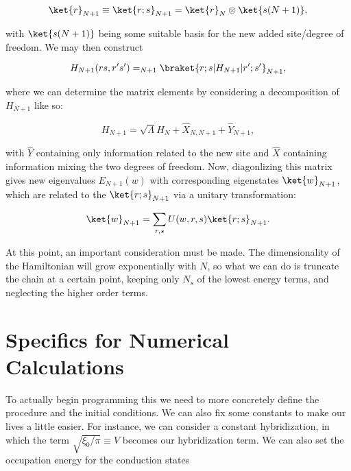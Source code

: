 \begin{equation}
  \ket{r}_{N+1} \equiv \ket{r;s}_{N+1} = \ket{r}_N \otimes \ket{s(N+1)},
\end{equation}

with $\ket{s(N+1)}$ being some suitable basis for the new added site/degree of freedom. We may then construct

\begin{equation}
  H_{N+1}(rs, r's') = _{N+1}\braket{r;s | H_{N+1} | r';s'}_{N+1},
\end{equation}

where we can determine the matrix elements by considering a decomposition of $H_{N+1}$ like so:

\begin{equation}
  H_{N+1} = \sqrt{\Lambda}H_N + \hat{X}_{N,N+1} + \hat{Y}_{N+1},
\end{equation}

with $\hat{Y}$ containing only information related to the new site and $\hat{X}$ containing information mixing the two degrees of freedom. Now, diagonlizing this matrix gives new eigenvalues $E_{N+1}(w)$ with corresponding eigenstates $\ket{w}_{N+1}$, which are related to the $\ket{r;s}_{N+1}$ via a unitary transformation:

\begin{equation}
  \ket{w}_{N+1} = \sum_{r,s} U(w,r,s)\ket{r;s}_{N+1}.
\end{equation}

At this point, an important consideration must be made. The dimensionality of the Hamiltonian will grow exponentially with $N$, so what we can do is truncate the chain at a certain point, keeping only $N_s$ of the lowest energy terms, and neglecting the higher order terms.






\section{Specifics for Numerical Calculations}

To actually begin programming this we need to more concretely define the procedure and the initial conditions. We can also fix some constants to make our lives a little easier. For instance, we can consider a constant hybridization, in which the term $\sqrt{\xi_0/\pi} \equiv V$ becomes our hybridization term. We can also set the occupation energy for the conduction states






